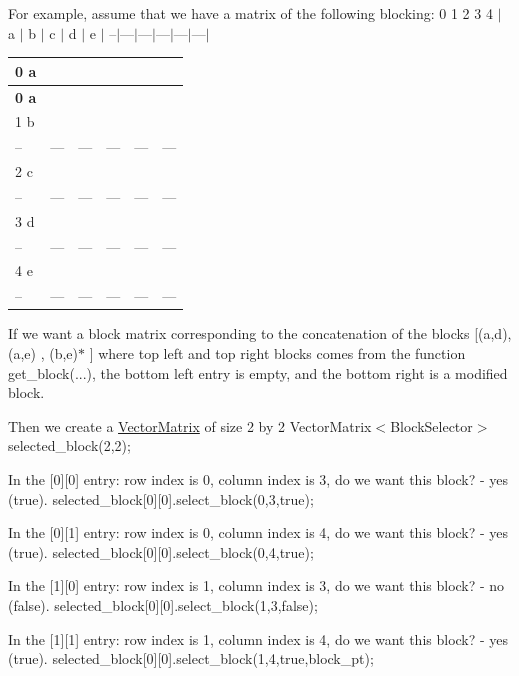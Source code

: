 For example, assume that we have a matrix of the following blocking\+: 0 1 2 3 4 $\vert$ a $\vert$ b $\vert$ c $\vert$ d $\vert$ e $\vert$ --$\vert$---$\vert$---$\vert$---$\vert$---$\vert$---$\vert$ \tabulinesep=1mm
\begin{longtabu} spread 0pt [c]{*{6}{|X[-1]}|}
\hline
\rowcolor{\tableheadbgcolor}\textbf{ 0 a }&\textbf{ }&\textbf{ }&\textbf{ }&\textbf{ }&\textbf{ }\\
\endfirsthead
\hline
\endfoot
\hline
\rowcolor{\tableheadbgcolor}\textbf{ 0 a }&\textbf{ }&\textbf{ }&\textbf{ }&\textbf{ }&\textbf{ }\\
 b &&&&&\\
--&---&---&---&---&--- \\
2 c &&&&&\\
--&---&---&---&---&--- \\
3 d &&&&&\\
--&---&---&---&---&--- \\
4 e &&&&&\\
--&---&---&---&---&--- \\
\end{longtabu}
If we want a block matrix corresponding to the concatenation of the blocks \mbox{[}(a,d), (a,e) , (b,e)$\ast$ \mbox{]} where top left and top right blocks comes from the function get\+\_\+block(...), the bottom left entry is empty, and the bottom right is a modified block.

Then we create a \hyperlink{classoomph_1_1VectorMatrix}{Vector\+Matrix} of size 2 by 2 Vector\+Matrix$<$\+Block\+Selector$>$ selected\+\_\+block(2,2);

In the \mbox{[}0\mbox{]}\mbox{[}0\mbox{]} entry\+: row index is 0, column index is 3, do we want this block? -\/ yes (true). selected\+\_\+block\mbox{[}0\mbox{]}\mbox{[}0\mbox{]}.select\+\_\+block(0,3,true);

In the \mbox{[}0\mbox{]}\mbox{[}1\mbox{]} entry\+: row index is 0, column index is 4, do we want this block? -\/ yes (true). selected\+\_\+block\mbox{[}0\mbox{]}\mbox{[}0\mbox{]}.select\+\_\+block(0,4,true);

In the \mbox{[}1\mbox{]}\mbox{[}0\mbox{]} entry\+: row index is 1, column index is 3, do we want this block? -\/ no (false). selected\+\_\+block\mbox{[}0\mbox{]}\mbox{[}0\mbox{]}.select\+\_\+block(1,3,false);

In the \mbox{[}1\mbox{]}\mbox{[}1\mbox{]} entry\+: row index is 1, column index is 4, do we want this block? -\/ yes (true). selected\+\_\+block\mbox{[}0\mbox{]}\mbox{[}0\mbox{]}.select\+\_\+block(1,4,true,block\+\_\+pt);

